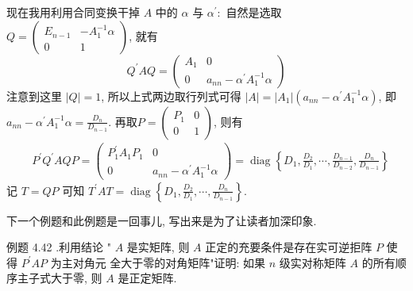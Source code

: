 \documentclass{article}
\begin{document}
现在我用利用合同变换干掉 $A$ 中的 $\alpha$ 与 $\alpha^{\prime}:$ 自然是选取 $Q=\left(\begin{array}{cc}E_{n-1} & -A_{1}^{-1} \alpha \\ 0 & 1\end{array}\right)$, 就有
\begin{equation*}
    Q^{\prime} A Q=\left(\begin{array}{cc}
            A_{1} & 0                                         \\
            0     & a_{n n}-\alpha^{\prime} A_{1}^{-1} \alpha
        \end{array}\right)
\end{equation*}
注意到这里 $|Q|=1$, 所以上式两边取行列式可得 $|A|=\left|A_{1}\right|\left(a_{n n}-\alpha^{\prime} A_{1}^{-1} \alpha\right)$, 即 $a_{n n}-\alpha^{\prime} A_{1}^{-1} \alpha=\frac{D_{n}}{D_{n-1}} .$ 再取$P=\left(\begin{array}{cl}
            P_{1} & 0 \\
            0     & 1
        \end{array}\right)$, 则有
\begin{equation*}
    \begin{aligned}
         & P^{\prime} Q^{\prime} A Q P=\left(\begin{array}{cc}
                P_{1}^{\prime} A_{1} P_{1} & 0                                         \\
                0                          & a_{n n}-\alpha^{\prime} A_{1}^{-1} \alpha
            \end{array}\right)=\operatorname{diag}\left\{D_{1}, \frac{D_{2}}{D_{1}}, \cdots, \frac{D_{n-1}}{D_{n-2}}, \frac{D_{n}}{D_{n-1}}\right\}
    \end{aligned}
\end{equation*}
记 $T=Q P$ 可知 $T^{\prime} A T=\operatorname{diag}\left\{D_{1}, \frac{D_{2}}{D_{1}}, \cdots, \frac{D_{n}}{D_{n-1}}\right\}$.

\vspace{1ex}
下一个例题和此例题是一回事儿, 写出来是为了让读者加深印象.

{\heiti 例题 4.42 .}{\kaishu 利用结论 " $A$ 是实矩阵, 则 $A$ 正定的充要条件是存在实可逆拒阵 $P$ 使得 $P^{\prime} A P$ 为主对角元 全大于零的对角矩阵"证明: 如果 $n$ 级实对称矩阵 $A$ 的所有顺序主子式大于零, 则 $A$ 是正定矩阵.}
\end{document}
